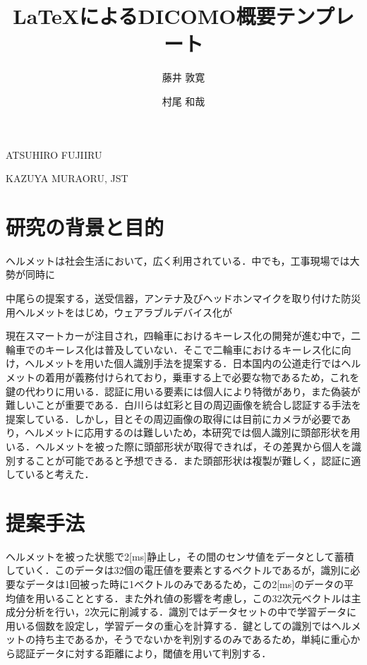 \documentclass[Japanese,noauthor]{dicomopapers}
\begin{document}
\title{{\LaTeX}によるDICOMO概要テンプレート}



\author{藤井 敦寛}{ATSUHIRO FUJII}{RU}
\author{村尾 和哉}{KAZUYA MURAO}{RU, JST}

\maketitle

\section{研究の背景と目的}
ヘルメットは社会生活において，広く利用されている．中でも，工事現場では大勢が同時に

中尾ら\cite{disaster}の提案する，送受信器，アンテナ及びヘッドホンマイクを取り付けた防災用ヘルメットをはじめ，ウェアラブルデバイス化が



現在スマートカーが注目され，四輪車におけるキーレス化の開発が進む中で，二輪車でのキーレス化は普及していない．そこで二輪車におけるキーレス化に向け，ヘルメットを用いた個人識別手法を提案する．日本国内の公道走行ではヘルメットの着用が義務付けられており，乗車する上で必要な物であるため，これを鍵の代わりに用いる．認証に用いる要素には個人により特徴があり，また偽装が難しいことが重要である．白川らは虹彩と目の周辺画像を統合し認証する手法を提案している\cite{iris_eye}．しかし，目とその周辺画像の取得には目前にカメラが必要であり，ヘルメットに応用するのは難しいため，本研究では個人識別に頭部形状を用いる．ヘルメットを被った際に頭部形状が取得できれば，その差異から個人を識別することが可能であると予想できる．また頭部形状は複製が難しく，認証に適していると考えた．

\section{提案手法}
ヘルメットを被った状態で2[ms]静止し，その間のセンサ値をデータとして蓄積していく．このデータは32個の電圧値を要素とするベクトルであるが，識別に必要なデータは1回被った時に1ベクトルのみであるため，この2[ms]のデータの平均値を用いることとする．また外れ値の影響を考慮し，この32次元ベクトルは主成分分析を行い，2次元に削減する．識別ではデータセットの中で学習データに用いる個数を設定し，学習データの重心を計算する．鍵としての識別ではヘルメットの持ち主であるか，そうでないかを判別するのみであるため，単純に重心から認証データに対する距離により，閾値を用いて判別する．
\end{document}
